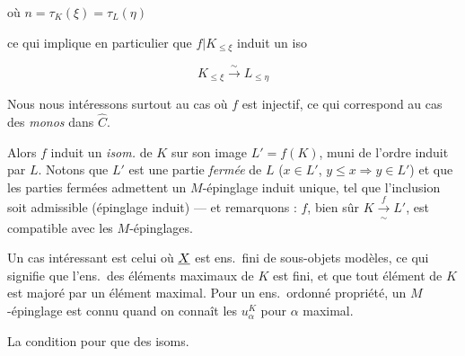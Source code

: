 \documentclass[11pt,a4paper]{article}
\begin{document}

où $n = \tau_K(\xi) = \tau_L(\eta)$



ce qui implique en particulier que $f|K_{\leq \xi}$ induit un iso

\[
K_{\leq \xi} \overset{\sim}{\longrightarrow} L_{\leq \eta}
\]

Nous nous intéressons surtout au cas où $f$ est injectif, ce qui correspond
\struck{\ill{}} au cas  des \emph{monos} dans $\widehat{C}$.

Alors $f$ induit un \emph{isom.} de $K$
sur \struck{\ill{}} son image $L' = f(K)$, muni de l'ordre induit par $L$.
Notons que $L'$ est une partie \emph{fermée} de $L$ ($x \in L'$, $y \leq x
\Rightarrow y \in L'$) et que les parties fermées admettent un $M$-épinglage
induit \struck{\ill{}} unique, tel que l'inclusion soit admissible (épinglage
induit) --- et remarquons : $f$, bien sûr
$K \overset{f}{\underset{\sim}{\longrightarrow}} L'$, est compatible avec les
$M$-épinglages.


Un cas intéressant est celui où $\uncertain{X}$  est  ens.\ fini de
sous-objets modèles, ce qui signifie que l'ens.\ des éléments maximaux de $K$
 est fini, et que tout élément de $K$ est majoré par
un élément maximal. Pour un ens.\ ordonné  \struck{\ill{}}
 propriété, un $M$-épinglage est connu quand on
connaît les $u_\alpha^K$ pour $\alpha$  maximal.


La condition pour que des isoms.
\end{document}
